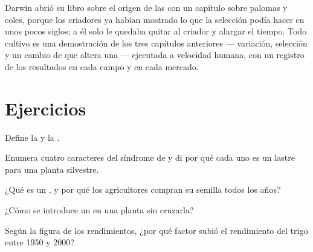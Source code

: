 \begin{remark}\label{rem:g12:domesticated-plants:oldest}
Darwin abrió su libro sobre el origen de las  con un capítulo
sobre palomas y coles, porque los criadores ya habían mostrado lo que
la selección podía hacer en unos pocos siglos; a él solo le quedaba
quitar al criador y alargar el tiempo. Todo cultivo es una
demostración de los tres capítulos anteriores --- variación, selección
y un cambio de  que altera una  --- ejecutada a
velocidad humana, con un registro de los resultados en cada campo y en
cada mercado.
\end{remark}

\section{Ejercicios}

\begin{exercise}[$\star$]\label{exo:g12:domesticated-plants:1}
Define la  y la .
\end{exercise}

\begin{exercise}[$\star$]\label{exo:g12:domesticated-plants:2}
Enumera cuatro caracteres del síndrome de  y di por qué
cada uno es un lastre para una planta silvestre.
\end{exercise}

\begin{exercise}[$\star$]\label{exo:g12:domesticated-plants:3}
¿Qué es un , y por qué los agricultores compran su semilla
todos los años?
\end{exercise}

\begin{exercise}[$\star$]\label{exo:g12:domesticated-plants:4}
¿Cómo se introduce un  en una planta sin cruzarla?
\end{exercise}

\begin{exercise}[$\star$]\label{exo:g12:domesticated-plants:5}
Según la figura de los rendimientos, ¿por qué factor subió el
rendimiento del trigo entre 1950 y 2000?
\end{exercise}


